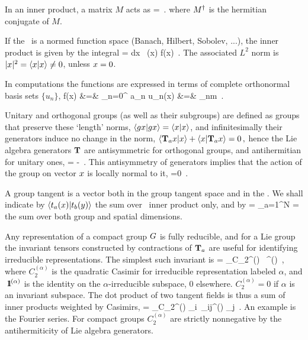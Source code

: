 In an inner product, a matrix $M$ acts as
\beq
{} =
\,.
where $\dual{M}$ is the hermitian conjugate of $M$.

If the \statesp\ is a normed function space (Banach, Hilbert, Sobolev, ...),
the inner product is given by the integral
\beq
{} = \int dx \, (x) f(x)
\,.
The associated $L^2$ norm is
$|\ssp|^2 = \braket{\ssp}{\ssp} \neq 0$, unless $\ssp = 0$.

In computations the functions are expressed in terms of
complete orthonormal basis sets $\{u_n\}$,
\bea
f(x) &=& \sum_{n=0}^{\infty} a_n u_n(x)
    \continue
{} &=& \delta_{nm}
\,.
\label{basisL2}
\eea

Unitary and orthogonal groups (as well as their subgroups) are defined as
groups that preserve these `length' norms, $\braket{\LieEl x}{\LieEl x} =
\braket{x}{x}$, and infinitesimally their generators
induce no change in the norm,
\(
\braket{ \Lg_a\ssp}{\ssp}
  +\braket{\ssp}{\Lg_a\ssp} =0
\,,
\)
hence the Lie algebra generators $\mathbf{T}$ are antisymmetric for orthogonal
groups, and antihermitian for unitary ones,
\beq
\dual{\Lg} = - \Lg
\,.
This antisymmetry of generators implies that the action of the group on
vector $x$ is locally normal to it,
\beq
{} =0
\,.

A group tangent
is a vector both in the group tangent space and in the \statesp.
We shall indicate by $\braket{\groupTan_{a}(x)}{\groupTan_{b}(y)}$
the sum over \statesp\ inner product only, and by
\beq
{} =
    \sum_{a=1}^N  =
the sum over both group and spatial dimensions.

Any representation of a compact group $G$ is fully reducible, and
for a Lie group the invariant tensors constructed by contractions of
$\mathbf{T}_a$ are useful for identifying irreducible representations. The
simplest such invariant is
\beq
\dual{\Lg} \cdot \Lg = \sum_\alpha C_2^{(\alpha)} \, \id^{(\alpha)}
\,,
where $C_2^{(\alpha)}$ is the quadratic Casimir for irreducible
representation labeled $\alpha$, and ${\ \hbox{{\rm 1}\kern-.62em\hbox{\rm 1}}}^{(\alpha)}$ is the identity on
the $\alpha$-irreducible subspace, 0 elsewhere. $ C_2^{(\alpha)} =0$ if
$\alpha$ is an invariant subspace. The dot product of two tangent fields
 is thus a sum of inner products weighted by Casimirs,
\beq
\braket{\groupTan(\sspRed)}{\groupTan(\slicep)}
   = \sum_\alpha C_2^{(\alpha)} \dual{\sspRed}_i\, \delta_{ij}^{(\alpha)} \slicep_j
\,.
An example is the Fourier series.
For compact groups $C_2^{(\alpha)}$ are strictly nonnegative by
the antihermiticity  of Lie algebra generators.
